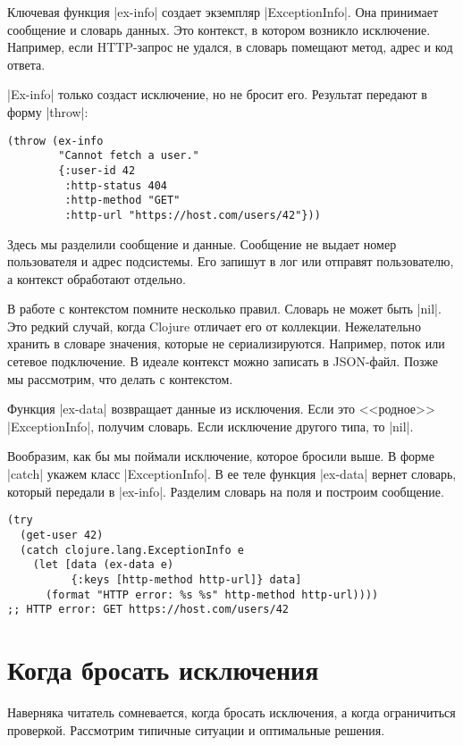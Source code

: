 Ключевая функция \spverb|ex-info| создает экземпляр \spverb|ExceptionInfo|. Она
принимает сообщение и словарь данных. Это контекст, в котором возникло
исключение. Например, если HTTP-запрос не удался, в словарь помещают метод,
адрес и код ответа.

\spverb|Ex-info| только создаст исключение, но не бросит его. Результат передают
в форму \spverb|throw|:

\begin{verbatim}
(throw (ex-info
        "Cannot fetch a user."
        {:user-id 42
         :http-status 404
         :http-method "GET"
         :http-url "https://host.com/users/42"}))
\end{verbatim}

Здесь мы разделили сообщение и данные. Сообщение не выдает номер пользователя и
адрес подсистемы. Его запишут в лог или отправят пользователю, а контекст
обработают отдельно.

В работе с контекстом помните несколько правил. Словарь не может быть
\spverb|nil|. Это редкий случай, когда Clojure отличает его от
коллекции. Нежелательно хранить в словаре значения, которые не
сериализируются. Например, поток или сетевое подключение. В идеале контекст
можно записать в JSON-файл. Позже мы рассмотрим, что делать с контекстом.

Функция \spverb|ex-data| возвращает данные из исключения. Если это <<родное>>
\spverb|ExceptionInfo|, получим словарь. Если исключение другого типа, то
\spverb|nil|.

Вообразим, как бы мы поймали исключение, которое бросили выше. В форме
\spverb|catch| укажем класс \spverb|ExceptionInfo|. В ее теле функция
\spverb|ex-data| вернет словарь, который передали в \spverb|ex-info|. Разделим
словарь на поля и построим сообщение.

\begin{verbatim}
(try
  (get-user 42)
  (catch clojure.lang.ExceptionInfo e
    (let [data (ex-data e)
          {:keys [http-method http-url]} data]
      (format "HTTP error: %s %s" http-method http-url))))
;; HTTP error: GET https://host.com/users/42
\end{verbatim}

\section{Когда бросать исключения}

Наверняка читатель сомневается, когда бросать исключения, а когда ограничиться
проверкой. Рассмотрим типичные ситуации и оптимальные решения.

